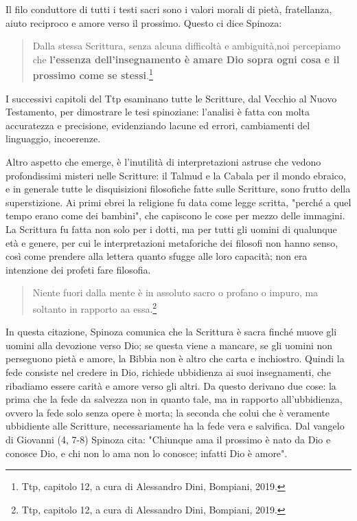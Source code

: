 Il filo conduttore di tutti i testi sacri sono i valori morali di pietà, fratellanza, aiuto reciproco e amore verso il prossimo. Questo ci dice Spinoza:

\begin{quotation}
	\small Dalla stessa Scrittura, senza alcuna difficoltà e ambiguità,noi percepiamo che \textbf{l'essenza dell'insegnamento è amare Dio sopra ogni cosa e il prossimo come se stessi}.\footnote{Ttp, capitolo 12, a cura di Alessandro Dini, Bompiani, 2019.}
 \end{quotation}

I successivi capitoli del Ttp esaminano tutte le Scritture, dal Vecchio al Nuovo Testamento, per dimostrare le tesi spinoziane: l'analisi è fatta con molta accuratezza e precisione, evidenziando lacune ed errori, cambiamenti del linguaggio, incoerenze.

Altro aspetto che emerge, è l'inutilità di interpretazioni astruse che vedono profondissimi misteri nelle Scritture: il Talmud e la Cabala per il mondo ebraico, e in generale tutte le disquisizioni filosofiche fatte sulle Scritture, sono frutto della superstizione.
Ai primi ebrei la religione fu data come legge scritta, "perché a quel tempo erano come dei bambini", che capiscono le cose per mezzo delle immagini. La Scrittura fu fatta non solo per i dotti, ma per tutti gli uomini di qualunque età e genere, per cui le interpretazioni metaforiche dei filosofi non hanno senso, così come  prendere alla lettera quanto sfugge alle loro capacità; non era intenzione dei profeti fare filosofia.

\begin{quotation}
	\small Niente fuori dalla mente è in assoluto sacro o profano o impuro, ma soltanto in rapporto aa essa.\footnote{Ttp, capitolo 12, a cura di Alessandro Dini, Bompiani, 2019.}
\end{quotation}

In questa citazione, Spinoza comunica che la Scrittura è sacra finché muove gli uomini alla devozione verso Dio; se questa viene a mancare, se gli uomini non perseguono pietà e amore,  la Bibbia non è altro che carta e inchiostro.
Quindi la fede consiste nel credere in Dio, richiede ubbidienza ai suoi insegnamenti, che ribadiamo essere carità e amore verso gli altri. Da questo derivano due cose: la prima che la fede da salvezza non in quanto tale, ma in rapporto all'ubbidienza, ovvero la fede solo senza opere è morta; la seconda che colui che è veramente ubbidiente alle Scritture, necessariamente ha la fede vera e salvifica. Dal vangelo di Giovanni (4, 7-8) Spinoza cita: "Chiunque ama il prossimo è nato da Dio e conosce Dio, e chi non lo ama non lo conosce; infatti Dio è amore".


